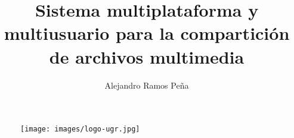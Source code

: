 \documentclass[16pt]{article}
\title{Sistema multiplataforma y multiusuario para la compartición de
archivos multimedia}
\author{Alejandro Ramos Peña}
\begin{document}
\begin{titlingpage}
  \maketitle
  \begin{figure}[!h]
    \centering
    \texttt{[image: images/logo-ugr.jpg]}
  \end{figure}
\end{titlingpage}



\tableofcontents
\newpage














\end{document}
